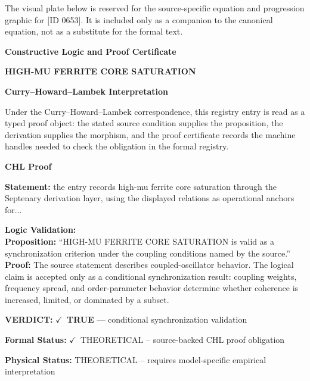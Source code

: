 \begingroup\footnotesize\sloppy
The visual plate below is reserved for the source-specific equation and progression graphic for [ID 0653]. It is included only as a companion to the canonical equation, not as a substitute for the formal text.
\par\endgroup
\ifTZPDarkEdition
{}
\fi

\clearpage
\begingroup\tzpsupportsetup
\noindent\textbf{\fontsize{10.8pt}{12.8pt}\selectfont [ID 0653] Constructive Logic and Proof Certificate}\par
\noindent\textbf{\fontsize{10pt}{12pt}\selectfont HIGH-MU FERRITE CORE SATURATION}\par
\vspace{0.45em}
\begingroup
\footnotesize
\setlength{\parskip}{0.22em}
\setlength{\parindent}{0pt}
\noindent\textbf{Curry--Howard--Lambek Interpretation}\par
Under the Curry--Howard--Lambek correspondence, this registry entry is read as a typed proof
object: the stated source condition supplies the proposition, the derivation supplies the
morphism, and the proof certificate records the machine handles needed to check the obligation
in the formal registry.

\vspace{0.45em}
\noindent\textbf{CHL Proof}\par
\textbf{Statement:} the entry records high-mu ferrite core saturation through the Septenary derivation
layer, using the displayed relations as operational anchors for...

\textbf{Logic Validation:}\\
\textbf{Proposition:} ``HIGH-MU FERRITE CORE SATURATION is valid as a synchronization criterion under the
coupling conditions named by the source.''\\
\textbf{Proof:} The source statement describes coupled-oscillator behavior. The logical claim is
accepted only as a conditional synchronization result: coupling weights, frequency
spread, and order-parameter behavior determine whether coherence is increased, limited,
or dominated by a subset.

\textbf{VERDICT:} \ensuremath{\checkmark}\ \textbf{TRUE} --- conditional synchronization validation

\textbf{Formal Status:} \ensuremath{\checkmark}\ THEORETICAL -- source-backed CHL proof obligation

\textbf{Physical Status:} THEORETICAL -- requires model-specific empirical interpretation
\par\vspace{0.45em}
\par
\ifTZPDarkEdition
{}
\fi
\endgroup
\endgroup
